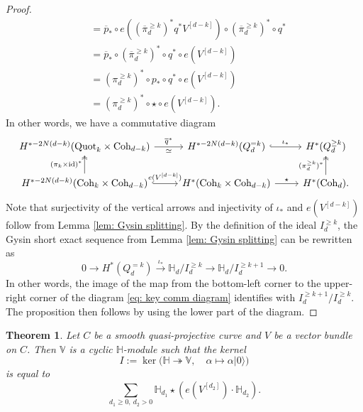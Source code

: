 \documentclass[10pt]{amsart}
\newcommand{\BH}{\mathbb{H}}
\newcommand{\BV}{\mathbb{V}}
\newcommand{\Quot}{\textnormal{Quot}}
\newcommand{\Coh}{\textnormal{Coh}}
\newcommand{\id}{\textnormal{id}}
\newcommand{\+}{{}^+}
\newtheorem{theorem}{Theorem}[section]
\theoremstyle{definition}
\theoremstyle {definition}
\theoremstyle {definition}
\begin{document}
\begin{proof}
\begin{align*}
    &=\overline{p}_*\circ e((\overline{\pi}_d^{\geq k})^*q^*V^{[d-k]})\circ (\overline{\pi}^{\geq k}_d)^*\circ q^*\\
    &=\overline{p}_*\circ (\overline{\pi}^{\geq k}_d)^*\circ q^*\circ e(V^{[d-k]})\\
    &=(\pi_d^{\geq k})^*\circ p_*\circ q^*\circ e(V^{[d-k]})\\
    &=(\pi_d^{\geq k})^*\circ \star \circ e(V^{[d-k]}). 
\end{align*}
In other words, we have a commutative diagram 
\begin{equation}\label{eq: key comm diagram}
    \begin{tikzcd}
H^{*-2N(d-k)}(\Quot_k\times \Coh_{d-k}) \arrow[r, "\simeq"', "\overline{q}^*"]                                     & H^{*-2N(d-k)}(Q^{=k}_d) \arrow[r, hook, "\iota_*"]                  & H^*(Q_d^{\geq k})                           \\
H^{*-2N(d-k)}(\Coh_k\times\Coh_{d-k}) \arrow[u, "(\pi_k\times\id)^*", two heads] \arrow[r, hook, "e(V^{[d-k]})"] & H^*(\Coh_k\times\Coh_{d-k}) \arrow[r, "\star"] & H^*(\Coh_d). \arrow[u, two heads, "(\pi_d^{\geq k})^*"]
\end{tikzcd}
\end{equation}
Note that surjectivity of the vertical arrows and injectivity of $\iota_*$ and $e(V^{[d-k]})$ follow from Lemma \ref{lem: Gysin splitting}. By the definition of the ideal $I_d^{\geq k}$, the Gysin short exact sequence from Lemma \ref{lem: Gysin splitting} can be rewritten as 
$$0\rightarrow H^*(Q^{=k}_d)\xrightarrow{\iota_*} \BH_d/I_d^{\geq k}\rightarrow \BH_d/I_d^{\geq k+1}\rightarrow 0. 
$$
In other words, the image of the map from the bottom-left corner to the upper-right corner of the diagram \eqref{eq: key comm diagram} identifies with $I^{\geq k+1}_d/I^{\geq k}_d$. The proposition then follows by using the lower part of the diagram. 

\end{proof}



\begin{theorem} \label{thm:quotschemekernel}
    Let $C$ be a smooth quasi-projective curve and $V$ be a vector bundle on $C$. Then $\BV$ is a cyclic $\BH$-module such that the kernel
$$I:=\ker\Big(\BH\twoheadrightarrow\BV,\quad \alpha\mapsto \alpha|0\rangle\Big)
    $$
    is equal to 
    $$\sum_{d_1\geq 0,\ d_2>0} \BH_{d_1}\star(e(V^{[d_2]})\cdot\BH_{d_2}). 
    $$
\end{theorem}
\end{document}
